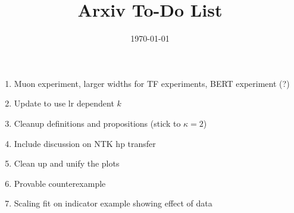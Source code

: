 \documentclass{article}
\title{Arxiv To-Do List}
\date{\today}
\begin{document}
\maketitle

\begin{enumerate}
    \item Muon experiment, larger widths for TF experiments, BERT experiment (?)
    \item Update to use lr dependent $k$
    \item Cleanup definitions and propositions (stick to $\kappa = 2$)
    \item Include discussion on NTK hp transfer
    \item Clean up and unify the plots
    \item Provable counterexample
    \item Scaling fit on indicator example showing effect of data
\end{enumerate}
\end{document}
